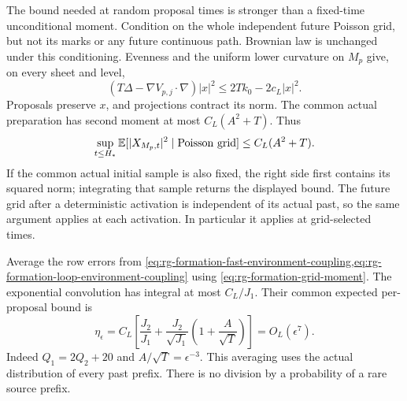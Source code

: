 The bound needed at random proposal times is stronger than a
fixed-time unconditional moment. Condition on the whole independent
future Poisson grid, but not its marks or any future continuous
path. Brownian law is unchanged under this conditioning.
Evenness and the uniform lower curvature on $M_p$ give, on every
sheet and level,
\begin{equation}
 (T\Delta-\nabla V_{p,j}\cdot\nabla)|x|^2
 \le2Tk_0-2c_L|x|^2.
 \label{eq:rg-formation-grid-moment-generator}
\end{equation}
Proposals preserve $x$, and projections contract its norm.
The common actual preparation has second moment at most
$C_L(A^2+T)$. Thus
\begin{equation}
 \sup_{t\le H_*}\mathbb E[|X_{M_p,t}|^2\mid\text{Poisson grid}]
 \le C_L(A^2+T).
 \label{eq:rg-formation-grid-moment}
\end{equation}
If the common actual initial sample is also fixed, the right side
first contains its squared norm; integrating that sample returns
the displayed bound. The future grid after a deterministic
activation is independent of its actual past, so the same argument
applies at each activation.
In particular it applies at grid-selected times.

Average the row errors from
\cref{eq:rg-formation-fast-environment-coupling,eq:rg-formation-loop-environment-coupling}
using \cref{eq:rg-formation-grid-moment}. The exponential
convolution has integral at most $C_L/J_1$. Their common expected
per-proposal bound is
\begin{equation}
 \eta_\epsilon
 =C_L\left[\frac{J_2}{J_1}
       +\frac{J_2}{\sqrt{J_1}}
                       \left(1+\frac A{\sqrt T}\right)\right]
 =O_L(\epsilon^7).
 \label{eq:rg-formation-averaged-environment-error}
\end{equation}
Indeed $Q_1=2Q_2+20$ and $A/\sqrt T=\epsilon^{-3}$.
This averaging uses the actual distribution of every past prefix.
There is no division by a probability of a rare source prefix.

